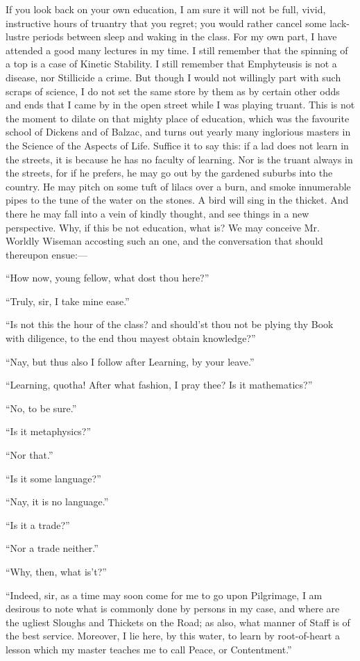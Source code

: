 If you look back on your own education, I am sure it will not be full,
vivid, instructive hours of truantry that you regret; you would rather
cancel some lack-lustre periods between sleep and waking in the class.
For my own part, I have attended a good many lectures in my time. I
still remember that the spinning of a top is a case of Kinetic
Stability. I still remember that Emphyteusis is not a disease, nor
Stillicide a crime. But though I would not willingly part with such
scraps of science, I do not set the same store by them as by certain
other odds and ends that I came by in the open street while I was
playing truant. This is not the moment to dilate on that mighty place
of education, which was the favourite school of Dickens and of Balzac,
and turns out yearly many inglorious masters in the Science of the
Aspects of Life. Suffice it to say this: if a lad does not learn in
the streets, it is because he has no faculty of  learning.
Nor is the truant always in the streets, for if he prefers, he may go
out by the gardened suburbs into the country. He may pitch on some
tuft of lilacs over a burn, and smoke innumerable pipes to the tune of
the water on the stones. A bird will sing in the thicket. And there he
may fall into a vein of kindly thought, and see things in a new
perspective. Why, if this be not education, what is? We may conceive
Mr. Worldly Wiseman accosting such an one, and the conversation that
should thereupon ensue:---

``How now, young fellow, what dost thou here?''

``Truly, sir, I take mine ease.''

``Is not this the hour of the class? and should'st thou not be plying
thy Book with diligence, to the end thou mayest obtain knowledge?''

``Nay, but thus also I follow after Learning, by your leave.''

``Learning, quotha! After what fashion, I pray thee? Is it
mathematics?''

``No, to be sure.''

``Is it metaphysics?''

``Nor that.''

``Is it some language?''

``Nay, it is no language.''

``Is it a trade?''

``Nor a trade neither.''

``Why, then, what is't?''

``Indeed, sir, as a time may soon come for me to go upon Pilgrimage, I
am desirous to note what is commonly done by persons in my case, and
where are the ugliest Sloughs and Thickets on the Road; as also, what
manner of Staff is of the best service. Moreover, I lie here, by this
water, to learn by root-of-heart a lesson which my master teaches me
to call Peace, or Contentment.''

